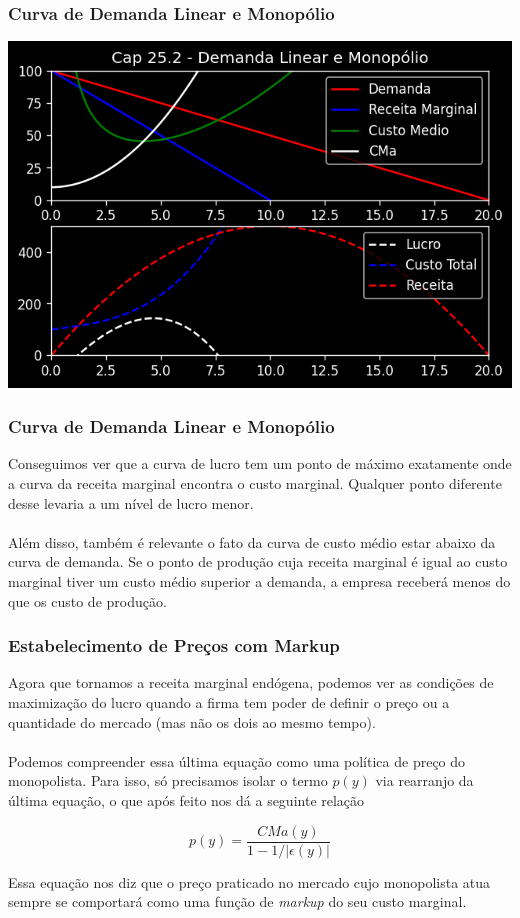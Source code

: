\documentclass{beamer}[10]
\begin{document}
\begin{frame}
	\frametitle{Curva de Demanda Linear e Monopólio}

	\begin{center}
		\includegraphics[scale=0.7]{cap25_2-demanda_linear_e_monopolio.png}
	\end{center}
	
\end{frame}

\begin{frame}
	\frametitle{Curva de Demanda Linear e Monopólio}

	Conseguimos ver que a curva de lucro tem um ponto de máximo exatamente onde a curva da receita marginal encontra o custo marginal. Qualquer ponto diferente desse levaria a um nível de lucro menor.
	\\~\\
	Além disso, também é relevante o fato da curva de custo médio estar abaixo da curva de demanda. Se o ponto de produção cuja receita marginal é igual ao custo marginal tiver um custo médio superior a demanda, a empresa receberá menos do que os custo de produção.
\end{frame}


\begin{frame}
	\frametitle{Estabelecimento de Preços com Markup}
	
	Agora que tornamos a receita marginal endógena, podemos ver as condições de maximização do lucro quando a firma tem poder de definir o preço ou a quantidade do mercado (mas não os dois ao mesmo tempo).
	\\~\\
	Podemos compreender essa última equação como uma política de preço do monopolista. Para isso, só precisamos isolar o termo $p(y)$ via rearranjo da última equação, o que após feito nos dá a seguinte relação

	$$ p(y) = \frac{CMa(y)}{1 - 1/|\epsilon(y)|} $$

	Essa equação nos diz que o preço praticado no mercado cujo monopolista atua sempre se comportará como uma função de \textit{markup} do seu custo marginal.
\end{frame}
\end{document}
